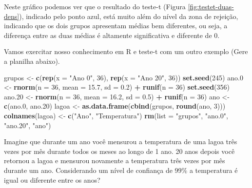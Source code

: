 \documentclass[]{book}
\newenvironment{Shaded}{\begin{snugshade}}{\end{snugshade}}
\newcommand{\DataTypeTok}[1]{\textcolor[rgb]{0.13,0.29,0.53}{#1}}
\newcommand{\DecValTok}[1]{\textcolor[rgb]{0.00,0.00,0.81}{#1}}
\newcommand{\FloatTok}[1]{\textcolor[rgb]{0.00,0.00,0.81}{#1}}
\newcommand{\KeywordTok}[1]{\textcolor[rgb]{0.13,0.29,0.53}{\textbf{#1}}}
\newcommand{\NormalTok}[1]{#1}
\newcommand{\OperatorTok}[1]{\textcolor[rgb]{0.81,0.36,0.00}{\textbf{#1}}}
\newcommand{\StringTok}[1]{\textcolor[rgb]{0.31,0.60,0.02}{#1}}
\begin{document}
Neste gráfico podemos ver que o resultado do teste-t (Figura \ref{fig:testet-duas-dens}), indicado pelo ponto azul, está muito além do nível da zona de rejeição, indicando que os dois grupos apresentam médias bem diferentes, ou seja, a diferença entre as duas médias é altamente significativa e diferente de 0.

Vamos exercitar nosso conhecimento em R e teste-t com um outro exemplo (Gere a planilha abaixo).

\begin{Shaded}
\begin{Highlighting}[]
\NormalTok{grupos <-}\StringTok{ }\KeywordTok{c}\NormalTok{(}\KeywordTok{rep}\NormalTok{(}\DataTypeTok{x =} \StringTok{"Ano 0"}\NormalTok{, }\DecValTok{36}\NormalTok{), }\KeywordTok{rep}\NormalTok{(}\DataTypeTok{x =} \StringTok{"Ano 20"}\NormalTok{, }\DecValTok{36}\NormalTok{))}
\KeywordTok{set.seed}\NormalTok{(}\DecValTok{245}\NormalTok{)}
\NormalTok{ano}\FloatTok{.0}\NormalTok{ <-}\StringTok{ }\KeywordTok{rnorm}\NormalTok{(}\DataTypeTok{n =} \DecValTok{36}\NormalTok{, }\DataTypeTok{mean =} \FloatTok{15.7}\NormalTok{, }\DataTypeTok{sd =} \FloatTok{0.2}\NormalTok{) }\OperatorTok{+}\StringTok{ }\KeywordTok{runif}\NormalTok{(}\DataTypeTok{n =} \DecValTok{36}\NormalTok{)}
\KeywordTok{set.seed}\NormalTok{(}\DecValTok{356}\NormalTok{)}
\NormalTok{ano}\FloatTok{.20}\NormalTok{ <-}\StringTok{ }\KeywordTok{rnorm}\NormalTok{(}\DataTypeTok{n =} \DecValTok{36}\NormalTok{, }\DataTypeTok{mean =} \FloatTok{16.2}\NormalTok{, }\DataTypeTok{sd =} \FloatTok{0.5}\NormalTok{) }\OperatorTok{+}\StringTok{ }\KeywordTok{runif}\NormalTok{(}\DataTypeTok{n =} \DecValTok{36}\NormalTok{)}
\NormalTok{ano <-}\StringTok{ }\KeywordTok{c}\NormalTok{(ano}\FloatTok{.0}\NormalTok{, ano}\FloatTok{.20}\NormalTok{)}
\NormalTok{lagoa <-}\StringTok{ }\KeywordTok{as.data.frame}\NormalTok{(}\KeywordTok{cbind}\NormalTok{(grupos, }\KeywordTok{round}\NormalTok{(ano, }\DecValTok{3}\NormalTok{)))}
\KeywordTok{colnames}\NormalTok{(lagoa) <-}\StringTok{ }\KeywordTok{c}\NormalTok{(}\StringTok{"Ano"}\NormalTok{, }\StringTok{"Temperatura"}\NormalTok{)}
\KeywordTok{rm}\NormalTok{(}\DataTypeTok{list =} \StringTok{"grupos"}\NormalTok{, }\StringTok{"ano.0"}\NormalTok{, }\StringTok{"ano.20"}\NormalTok{, }\StringTok{"ano"}\NormalTok{)}
\end{Highlighting}
\end{Shaded}

Imagine que durante um ano você mensurou a temperatura de uma lagoa três vezes por mês durante todos os meses ao longo de 1 ano. 20 anos depois você retornou a lagoa e mensurou novamente a temperatura três vezes por mês durante um ano. Considerando um nível de confiança de 99\% a temperatura é igual ou diferente entre os anos?
\end{document}
